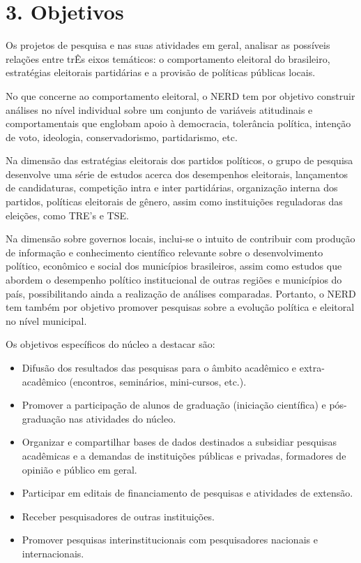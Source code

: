 \documentclass[
  12pt,
]{report}
\begin{document}
\hypertarget{objetivos}{%
\section{3. Objetivos}\label{objetivos}}

Os projetos de pesquisa e nas suas atividades em geral, analisar as
possíveis relações entre trÊs eixos temáticos: o comportamento eleitoral
do brasileiro, estratégias eleitorais partidárias e a provisão de
políticas públicas locais.

No que concerne ao comportamento eleitoral, o NERD tem por objetivo
construir análises no nível individual sobre um conjunto de variáveis
atitudinais e comportamentais que englobam apoio à democracia,
tolerância política, intenção de voto, ideologia, conservadorismo,
partidarismo, etc.

Na dimensão das estratégias eleitorais dos partidos políticos, o grupo
de pesquisa desenvolve uma série de estudos acerca dos desempenhos
eleitorais, lançamentos de candidaturas, competição intra e inter
partidárias, organização interna dos partidos, políticas eleitorais de
gênero, assim como instituições reguladoras das eleições, como TRE's e
TSE.

Na dimensão sobre governos locais, inclui-se o intuito de contribuir com
produção de informação e conhecimento científico relevante sobre o
desenvolvimento político, econômico e social dos municípios brasileiros,
assim como estudos que abordem o desempenho político institucional de
outras regiões e municípios do país, possibilitando ainda a realização
de análises comparadas. Portanto, o NERD tem também por objetivo
promover pesquisas sobre a evolução política e eleitoral no nível
municipal.

Os objetivos específicos do núcleo a destacar são:

\begin{itemize}
\item
  Difusão dos resultados das pesquisas para o âmbito acadêmico e
  extra-acadêmico (encontros, seminários, mini-cursos, etc.).
\item
  Promover a participação de alunos de graduação (iniciação científica)
  e pós-graduação nas atividades do núcleo.
\item
  Organizar e compartilhar bases de dados destinados a subsidiar
  pesquisas acadêmicas e a demandas de instituições públicas e privadas,
  formadores de opinião e público em geral.
\item
  Participar em editais de financiamento de pesquisas e atividades de
  extensão.
\item
  Receber pesquisadores de outras instituições.
\item
  Promover pesquisas interinstitucionais com pesquisadores nacionais e
  internacionais.
\end{itemize}
\end{document}
